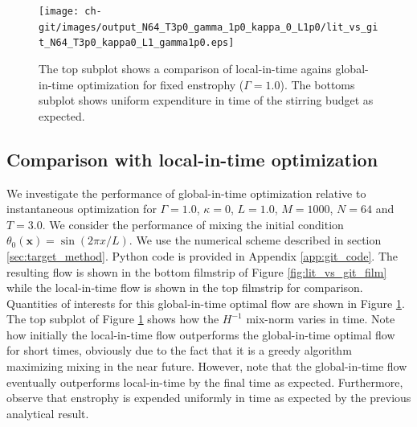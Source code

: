 \begin{figure}
\centering
\texttt{[image: ch-git/images/output\_N64\_T3p0\_gamma\_1p0\_kappa\_0\_L1p0/lit\_vs\_git\_N64\_T3p0\_kappa0\_L1\_gamma1p0.eps]}
\caption{The top subplot shows a comparison of local-in-time agains global-in-time optimization for fixed enstrophy ($\Gamma = 1.0$). The bottoms subplot shows uniform expenditure in time of the stirring budget as expected.}
\label{fig:lit_vs_git}
\end{figure}


\subsection{Comparison with local-in-time optimization}
We investigate the performance of global-in-time optimization relative to instantaneous optimization for $\Gamma =1.0$, $\kappa = 0$, $L=1.0$, $M=1000$, $N=64$ and $T=3.0$. We consider the performance of mixing the initial condition $\theta_0(\mathbf{x}) = \sin( 2\pi x/L).$ We use the numerical scheme described in section \ref{sec:target_method}. Python code is provided in Appendix \ref{app:git_code}. The resulting flow is shown in the bottom filmstrip of Figure \ref{fig:lit_vs_git_film} while the local-in-time flow is shown in the top filmstrip for comparison. Quantities of interests for this global-in-time optimal flow are shown in Figure \ref{fig:lit_vs_git}. The top subplot of Figure \ref{fig:lit_vs_git} shows how the $H^{-1}$ mix-norm varies in time. Note how initially the local-in-time flow outperforms the global-in-time optimal flow for short times, obviously due to the fact that it is a greedy algorithm maximizing mixing in the near future. However, note that the global-in-time flow eventually outperforms local-in-time by the final time as expected. Furthermore, observe that enstrophy is expended uniformly in time as expected by the previous analytical result.









